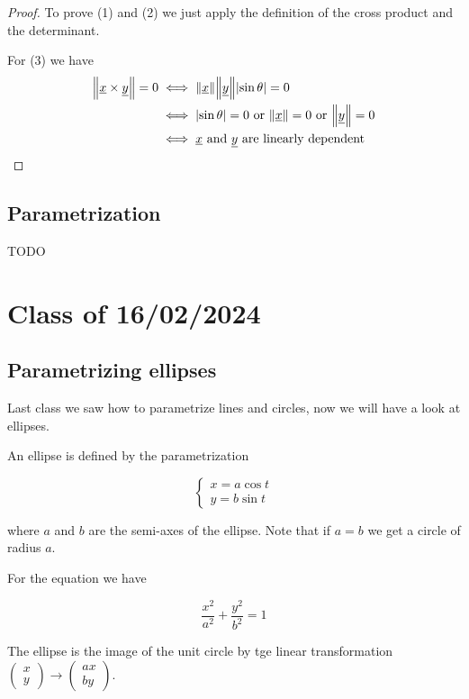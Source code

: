 \documentclass[10pt]{extarticle}
\begin{document}
\begin{proof}
    To prove (1) and (2) we just apply the definition of the cross product and the determinant.

    For (3) we have
    \begin{align*}
        \norm{\underline{x} \times \underline{y}} = 0
         & \iff
        \norm {\underline{x}} \norm{\underline{y}} \abs{\sin \theta} = 0                                        \\
         & \iff \abs{\sin \theta} = 0 \text{ or } \norm{\underline{x}} = 0 \text{ or } \norm{\underline{y}} = 0 \\
         & \iff \underline{x} \text{ and } \underline{y} \text{ are linearly dependent}
    \end{align*}

\end{proof}

\subsection{Parametrization}

TODO

\section{Class of 16/02/2024}

\subsection{Parametrizing ellipses}

Last class we saw how to parametrize lines and circles, now we will have a look at ellipses.

An ellipse is defined by the parametrization

\[
    \begin{cases}
        x = a \cos t \\
        y = b \sin t
    \end{cases}
\]

where $a$ and $b$ are the semi-axes of the ellipse. Note that if $a = b$ we get a circle of radius $a$.

For the equation we have

$$
    \frac{x^2}{a^2} + \frac{y^2}{b^2} = 1
$$

The ellipse is the image of the unit circle by tge linear transformation $\begin{pmatrix}
        x \\ y
    \end{pmatrix} \to \begin{pmatrix}
        ax \\ by
    \end{pmatrix}$.
\end{document}
